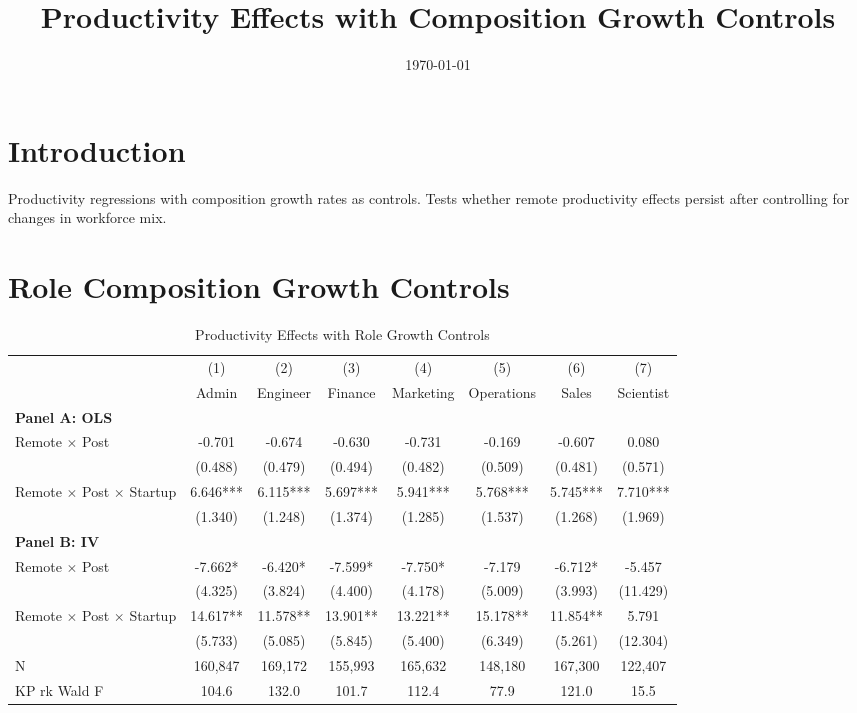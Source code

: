 \documentclass[11pt]{article}
\title{Productivity Effects with Composition Growth Controls}
\date{\today}
\begin{document}
\maketitle

\section{Introduction}

Productivity regressions with composition growth rates as controls. Tests whether remote productivity effects persist after controlling for changes in workforce mix.

\section{Role Composition Growth Controls}

\begin{table}[H]
\centering
\caption{Productivity Effects with Role Growth Controls}
\begin{tabular}{lccccccc}
\toprule
 & (1) & (2) & (3) & (4) & (5) & (6) & (7) \\
 & Admin & Engineer & Finance & Marketing & Operations & Sales & Scientist \\
\midrule
\multicolumn{8}{l}{\textbf{Panel A: OLS}} \\
\addlinespace
Remote $\times$ Post & -0.701 & -0.674 & -0.630 & -0.731 & -0.169 & -0.607 & 0.080 \\ & (0.488) & (0.479) & (0.494) & (0.482) & (0.509) & (0.481) & (0.571) \\
\addlinespace[0.5em]
Remote $\times$ Post $\times$ Startup & 6.646*** & 6.115*** & 5.697*** & 5.941*** & 5.768*** & 5.745*** & 7.710*** \\ & (1.340) & (1.248) & (1.374) & (1.285) & (1.537) & (1.268) & (1.969) \\
\midrule
\multicolumn{8}{l}{\textbf{Panel B: IV}} \\
\addlinespace
Remote $\times$ Post & -7.662* & -6.420* & -7.599* & -7.750* & -7.179 & -6.712* & -5.457 \\ & (4.325) & (3.824) & (4.400) & (4.178) & (5.009) & (3.993) & (11.429) \\
\addlinespace[0.5em]
Remote $\times$ Post $\times$ Startup & 14.617** & 11.578** & 13.901** & 13.221** & 15.178** & 11.854** & 5.791 \\ & (5.733) & (5.085) & (5.845) & (5.400) & (6.349) & (5.261) & (12.304) \\
\midrule
N & 160,847 & 169,172 & 155,993 & 165,632 & 148,180 & 167,300 & 122,407 \\
KP rk Wald F & 104.6 & 132.0 & 101.7 & 112.4 & 77.9 & 121.0 & 15.5\\
\bottomrule
\end{tabular}
\end{table}
\end{document}
